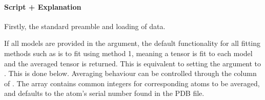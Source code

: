 \documentclass[a4paper,10pt,english,openany,oneside]{sphinxmanual}
\begin{document}
\paragraph{Script + Explanation}
\label{\detokenize{examples/pcs_fit_models:script-explanation}}
\sphinxAtStartPar
Firstly, the standard preamble and loading of data.

\begin{sphinxVerbatim}[commandchars=\\\{\}]
      

  
  
  
\end{sphinxVerbatim}

\sphinxAtStartPar
If all models are provided in the  argument, the default functionality for all fitting methods such as {\hyperref[\detokenize{reference/generated/paramagpy.fit.nlr_fit_metal_from_pcs:paramagpy.fit.nlr_fit_metal_from_pcs}]{}} is to fit using method 1, meaning a tensor is fit to each model and the averaged tensor is returned. This is equivalent to setting the  argument to . This is done below. Averaging behaviour can be controlled through the  column of . The  array contains common integers for corresponding atoms to be averaged, and defaults to the atom’s serial number found in the PDB file.
\end{document}
